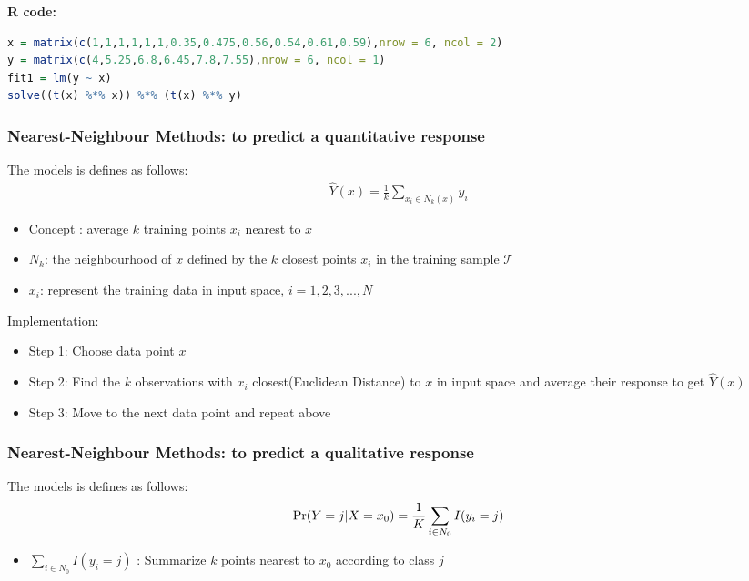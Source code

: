 \documentclass[12pt,a4paper]{article}%
\theoremstyle{definition}
\theoremstyle{plain}
\numberwithin{equation}{section}
\begin{document}
\begin{framed}
\textbf{R code:}
\tiny
\begin{lstlisting}[language=R]
x = matrix(c(1,1,1,1,1,1,0.35,0.475,0.56,0.54,0.61,0.59),nrow = 6, ncol = 2)
y = matrix(c(4,5.25,6.8,6.45,7.8,7.55),nrow = 6, ncol = 1)
fit1 = lm(y ~ x)
solve((t(x) %*% x)) %*% (t(x) %*% y)
\end{lstlisting}
\end{framed}


\subsubsection{\textbf{Nearest-Neighbour Methods: to predict a quantitative response}}
The models is defines as follows:
\begin{gather}
\hat{Y}(x)=\frac{1}{k}\sum\limits_{x_{i}\in N_{k}(x)} y_{i}
\end{gather}

\begin{itemize}
\item Concept : average $k$ training points $x_{i}$ nearest to $x$
\item $N_{k}$: the neighbourhood of $x$ defined by the $k$ closest points $x_{i}$ in the training sample $\mathcal{T}$
\item $x_{i}$: represent the training data in input space, $i=1,2,3,...,N$
\end{itemize}

Implementation:
\begin{itemize}
\item Step 1: Choose data point $x$
\item Step 2: Find the $k$ observations with $x_{i}$ closest(Euclidean Distance) to $x$ in input space and average their response to get $\hat{Y}(x)$
\item Step 3: Move to the next data point and repeat above
\end{itemize}


\subsubsection{\textbf{Nearest-Neighbour Methods: to predict a qualitative response}}
The models is defines as follows:
\begin{gather}
{\rm Pr}(Y=j|X=x_{0}) = \frac{1}{K}\sum\limits_{i \in N_{0}}I(y_{i}=j)
\end{gather}

\begin{itemize}
\item $\sum\limits_{i \in N_{0}}I(y_{i}=j)$ : Summarize $k$ points nearest to $x_{0}$ according to class $j$
\end{itemize}
\end{document}
